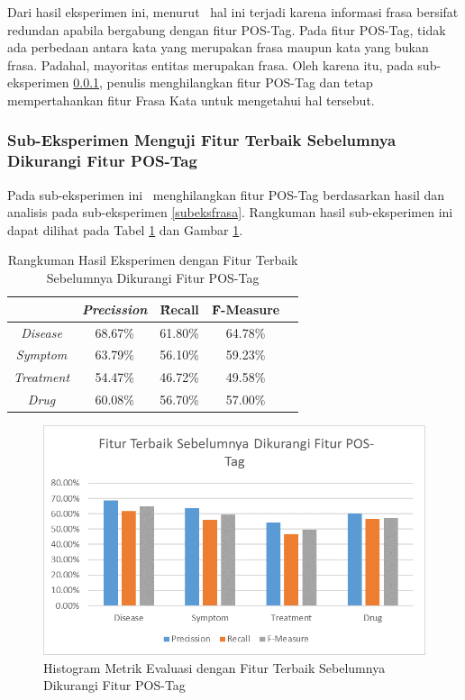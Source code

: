 	Dari hasil eksperimen ini, menurut \saya~hal ini terjadi karena informasi frasa bersifat redundan apabila bergabung dengan fitur POS-Tag. Pada fitur POS-Tag, tidak ada perbedaan antara kata yang merupakan frasa maupun kata yang bukan frasa. Padahal, mayoritas entitas merupakan frasa. Oleh karena itu, pada sub-eksperimen \ref{eks:subeksminpostag}, penulis menghilangkan fitur POS-Tag dan tetap mempertahankan fitur Frasa Kata untuk mengetahui hal tersebut. 
	
	\subsubsection{Sub-Eksperimen Menguji Fitur Terbaik Sebelumnya Dikurangi Fitur POS-Tag}\label{eks:subeksminpostag}
	Pada sub-eksperimen ini \saya~menghilangkan fitur POS-Tag berdasarkan hasil dan analisis pada sub-eksperimen \ref{subeksfrasa}. Rangkuman hasil sub-eksperimen ini dapat dilihat pada Tabel \ref{table:owndict6} dan Gambar \ref{fig:owndict6}.
	
	\begin{table}
		\centering
		\caption{Rangkuman Hasil Eksperimen dengan Fitur Terbaik Sebelumnya Dikurangi Fitur POS-Tag}
		\begin{tabular}{|c|c|c|c|c|}
			\hline
			                      & \textit{Precission} & \f{\f{Recall}} & \f{\f{F-Measure}} \\ \hline
			\textit{Disease}      & 68.67\%             & 61.80\%        & 64.78\%           \\ \hline
			\textit{Symptom}      & 63.79\%             & 56.10\%        & 59.23\%           \\ \hline
			\textit{Treatment}    & 54.47\%             & 46.72\%        & 49.58\%           \\ \hline
			\textit{Drug}		  & 60.08\%             & 56.70\%        & 57.00\%           \\ \hline
		\end{tabular}
		\label{table:owndict6}
	\end{table}
	
	\begin{figure}
		\centering
		\includegraphics[width=0.85\linewidth]{images/histogram6}
		\caption{Histogram Metrik Evaluasi dengan Fitur Terbaik Sebelumnya Dikurangi Fitur POS-Tag}
		\label{fig:owndict6}
	\end{figure}
	
